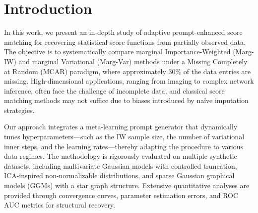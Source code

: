 \documentclass{article} %
\begin{document}
\begin{abstract}
thereby confirming our method’s efficacy in both parameter estimation and structure recovery under partial observations. These empirical validations underscore the relevance of adaptive score matching in high-dimensional and complex data regimes, set against the inherent difficulties of handling missing data and ensuring numerical stability in the estimation process, and pave the way for future extensions to accommodate MNAR scenarios and diffusion-based denoising score matching frameworks.
\end{abstract}

\section{Introduction}
In this work, we present an in-depth study of adaptive prompt-enhanced score matching for recovering statistical score functions from partially observed data. The objective is to systematically compare marginal Importance-Weighted (Marg-IW) and marginal Variational (Marg-Var) methods under a Missing Completely at Random (MCAR) paradigm, where approximately 30\% of the data entries are missing. High-dimensional applications, ranging from imaging to complex network inference, often face the challenge of incomplete data, and classical score matching methods may not suffice due to biases introduced by naïve imputation strategies.

Our approach integrates a meta-learning prompt generator that dynamically tunes hyperparameters—such as the IW sample size, the number of variational inner steps, and the learning rates—thereby adapting the procedure to various data regimes. The methodology is rigorously evaluated on multiple synthetic datasets, including multivariate Gaussian models with controlled truncation, ICA-inspired non-normalizable distributions, and sparse Gaussian graphical models (GGMs) with a star graph structure. Extensive quantitative analyses are provided through convergence curves, parameter estimation errors, and ROC AUC metrics for structural recovery.
\end{document}
